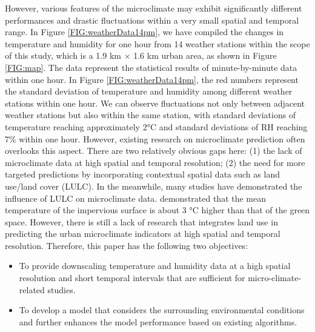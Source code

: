 \documentclass[a4paper,fleqn]{cas-sc}
\begin{document}


However, various features of the microclimate may exhibit significantly different performances and drastic fluctuations within a very small spatial and temporal range. In Figure \ref{FIG:weatherData14pm}, we have compiled the changes in temperature and humidity for one hour from 14 weather stations within the scope of this study, which is a  1.9 km $\times$ 1.6 km urban area, as shown in Figure \ref{FIG:map}. The data represent the statistical results of minute-by-minute data within one hour. In Figure \ref{FIG:weatherData14pm}, the red numbers represent the standard deviation of temperature and humidity among different weather stations within one hour. We can observe fluctuations not only between adjacent weather stations but also within the same station, with standard deviations of temperature reaching approximately 2°C and standard deviations of RH reaching 7\% within one hour. However, existing research on microclimate prediction often overlooks this aspect. There are two relatively obvious gaps here: (1) the lack of microclimate data at high spatial and temporal resolution; (2) the need for more targeted predictions by incorporating contextual spatial data such as land use/land cover (LULC). In the meanwhile, many studies have demonstrated the influence of LULC on microclimate data. \citet{estoque2017effects} demonstrated that the mean temperature of the impervious surface is about 3 °C higher than that of the green space. However, there is still a lack of research that integrates land use in predicting the urban microclimate indicators at high spatial and temporal resolution. Therefore, this paper has the following two objectives:
\begin{itemize}
\item{To provide downscaling temperature and humidity data at a high spatial resolution and short temporal intervals that are sufficient for micro-climate-related studies.}
\item{To develop a model that considers the surrounding environmental conditions and further enhances the model performance based on existing algorithms.}
\end{itemize}
\end{document}
